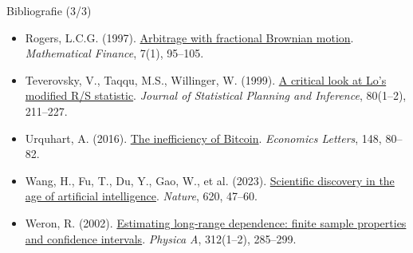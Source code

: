 \begin{frame}{Bibliografie (3/3)}
\begin{itemize}
    \item Rogers, L.C.G. (1997). \href{https://doi.org/10.1111/1467-9965.00025}{Arbitrage with fractional Brownian motion}. \textit{Mathematical Finance}, 7(1), 95--105.
    \item Teverovsky, V., Taqqu, M.S., Willinger, W. (1999). \href{https://doi.org/10.1016/S0378-3758(98)00250-X}{A critical look at Lo's modified R/S statistic}. \textit{Journal of Statistical Planning and Inference}, 80(1--2), 211--227.
    \item Urquhart, A. (2016). \href{https://doi.org/10.1016/j.econlet.2016.09.019}{The inefficiency of Bitcoin}. \textit{Economics Letters}, 148, 80--82.
    \item Wang, H., Fu, T., Du, Y., Gao, W., et al. (2023). \href{https://doi.org/10.1038/s41586-023-06221-2}{Scientific discovery in the age of artificial intelligence}. \textit{Nature}, 620, 47--60.
    \item Weron, R. (2002). \href{https://doi.org/10.1016/S0378-4371(02)00961-5}{Estimating long-range dependence: finite sample properties and confidence intervals}. \textit{Physica A}, 312(1--2), 285--299.
\end{itemize}
\end{frame}


